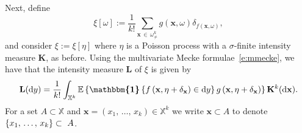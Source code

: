 \documentclass[AHL,Unicode,longabstracts]{cedram}
\newcommand*\bL{\mathbf{L}}
\newcommand*\bK{\mathbf{K}}
\newcommand{\bx}{\mathbf{x}}
\newcommand*\X{\mathbb{X}}
\newcommand{\E}{\mathbb{E}}
\newcommand*\md{\mathrm{d}}
\newcommand{\mean}[1] {\E\left\{{#1}\right\}}
\newcommand{\ind}{\boldsymbol{\mathbbm{1}}}
\newcommand{\set}[1]{\left\{#1\right\}}
\begin{document}
Next, define
\begin{equation}\label{e:defn_xi_ld}
\xi[\omega] := \frac{1}{k!}\sum_{\bx\,\in\,\omega^k_{\ne}}g(\bx,\omega)\delta_{f(\bx,\omega)},
\end{equation}
and consider $\xi:=\xi[\eta]$ where $\eta$ is a Poisson process with {a $\sigma$-finite} intensity measure $\bK$, as before. Using the multivariate Mecke formulae~\eqref{e:mmecke}, we have that the intensity measure $\bL$ of $\xi$ is given by
\begin{equation}\label{e:int_L_ld}
\bL(\md y) = \frac{1}{k!}\int_{\X^k} \mean{\ind\set{f\left(\bx,\eta+\delta_{\bx}\right) \in \md y} g\left(\bx,\eta+\delta_{\bx}\right)} \bK^k(\md \bx).
\end{equation}
For a set $A\subset \X$ and $\bx=(x_1,\,\hdots,\,x_k)\in\X^k$ we write $\bx\subset A$ to denote $\{x_1,\,\hdots,\,x_k\}\linebreak\subset~A$.
\end{document}
